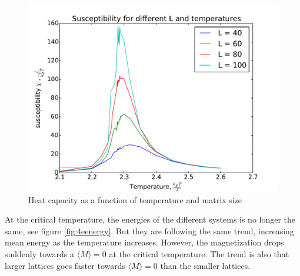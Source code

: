 \begin{figure}[H]
	\centering
	\includegraphics[width=0.7\linewidth]{../results/4e/4e_x}
	\caption{Heat capacity as a function of temperature and matrix size}
	\label{fig:4ex}
\end{figure}

At the critical temperature, the energies of the different systems is no longer the same, see figure \ref{fig:4eenergy}. But they are following the same trend, increasing mean energy as the temperature increases. However, the magnetization drops suddenly towards a $ \langle M \rangle  =0$ at the critical temperature. The trend is also that larger lattices goes faster towards $ \langle M \rangle  =0$ than the smaller lattices.

